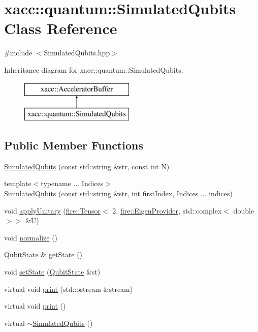 \hypertarget{a01247}{}\section{xacc\+:\+:quantum\+:\+:Simulated\+Qubits Class Reference}
\label{a01247}


{\ttfamily \#include $<$Simulated\+Qubits.\+hpp$>$}

Inheritance diagram for xacc\+:\+:quantum\+:\+:Simulated\+Qubits\+:\begin{figure}[H]
\begin{center}
\leavevmode
\includegraphics[height=2.000000cm]{a01247}
\end{center}
\end{figure}
\subsection*{Public Member Functions}
\begin{DoxyCompactItemize}
\item 
\hyperlink{a01247_abb0419229628210a1c187b76be6edc30}{Simulated\+Qubits} (const std\+::string \&str, const int N)
\item 
{\footnotesize template$<$typename ... Indices$>$ }\\\hyperlink{a01247_a812afe5bad306acfe2b46e05098040a4}{Simulated\+Qubits} (const std\+::string \&str, int first\+Index, Indices ... indices)
\item 
void \hyperlink{a01247_a3f4518d0135101141bf92d7e31f4fddc}{apply\+Unitary} (\hyperlink{a01347}{fire\+::\+Tensor}$<$ 2, \hyperlink{a01343}{fire\+::\+Eigen\+Provider}, std\+::complex$<$ double $>$$>$ \&U)
\item 
void \hyperlink{a01247_a09ee499769bb1eedaf08d6b5c29f9791}{normalize} ()
\item 
\hyperlink{a01347}{Qubit\+State} \& \hyperlink{a01247_a405577717ca200ed9e524c04209e0216}{get\+State} ()
\item 
void \hyperlink{a01247_a8cd74c239c1fcecb3d03d6989732d5fe}{set\+State} (\hyperlink{a01347}{Qubit\+State} \&st)
\item 
virtual void \hyperlink{a01247_a9252d30be0563f36bf1ff839c7104cd7}{print} (std\+::ostream \&stream)
\item 
virtual void \hyperlink{a01247_a32922bd2ccc64bba601c07a3c136cc3d}{print} ()
\item 
virtual \hyperlink{a01247_aebf6f30a6d8c84971091d87908680e7e}{$\sim$\+Simulated\+Qubits} ()
\end{DoxyCompactItemize}
